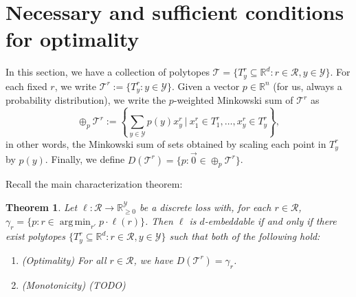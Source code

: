 \documentclass[12pt]{article}
\newcommand{\Opt}{\mathrm{Opt}}
\newcommand{\reals}{\mathbb{R}}
\newcommand{\simplex}{\Delta_\Y}
\newcommand{\R}{\mathcal{R}}
\newcommand{\T}{\mathcal{T}}
\newcommand{\Y}{\mathcal{Y}}
\DeclareMathOperator*{\argmin}{arg\,min}
\newtheorem{theorem}{Theorem}
\newtheorem{definition}{Definition}
\begin{document}
  \section{Necessary and sufficient conditions for optimality}
  In this section, we have a collection of polytopes $\T = \{T^r_y \subseteq \reals^d : r \in \R, y \in \Y\}$.
  For each fixed $r$, we write $\T^r := \{T^r_y : y \in \Y\}$.
  Given a vector $p \in \reals^n$ (for us, always a probability distribution), we write the $p$-weighted Minkowski sum of $\T^r$ as
    \[ \oplus_p \T^r := \left\{ \sum_{y \in \Y} p(y) x^r_y ~\Big|~ x^r_1 \in T^r_1, \dots, x^r_y \in T^r_y \right\} , \]
  in other words, the Minkowski sum of sets obtained by scaling each point in $T^r_y$ by $p(y)$.
  Finally, we define $D(\T^r) = \{ p : \vec{0} \in \oplus_p \T^r\}$.


  Recall the main characterization theorem:
  \begin{theorem}
    Let $\ell: \R \to \reals_{\geq 0}^{\Y}$ be a discrete loss with, for each $r \in \R$, $\gamma_r = \{p : r \in \argmin_{r'} p \cdot \ell(r)\}$.
    Then $\ell$ is $d$-embeddable if and only if there exist polytopes $\{T^r_y \subseteq \reals^d : r \in \R, y \in \Y\}$ such that both of the following hold:
    \begin{enumerate}
      \item (Optimality) For all $r \in \R$, we have $D(\T^r) = \gamma_r$. %
      \item (Monotonicity) (TODO)
    \end{enumerate}
  \end{theorem}
\end{document}
